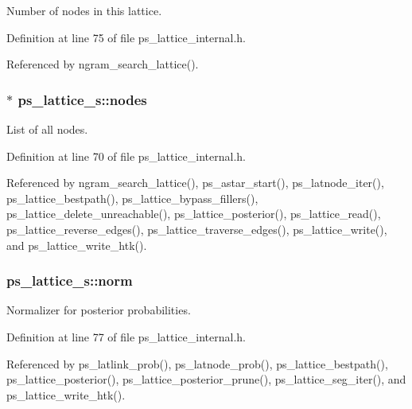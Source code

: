 \-Number of nodes in this lattice. 



\-Definition at line 75 of file ps\-\_\-lattice\-\_\-internal.\-h.



\-Referenced by ngram\-\_\-search\-\_\-lattice().

\subsubsection[{nodes}]{$\ast$ {\bf ps\-\_\-lattice\-\_\-s\-::nodes}}\label{structps__lattice__s_a838bd9223e35d012419e6225b54e393d}


\-List of all nodes. 



\-Definition at line 70 of file ps\-\_\-lattice\-\_\-internal.\-h.



\-Referenced by ngram\-\_\-search\-\_\-lattice(), ps\-\_\-astar\-\_\-start(), ps\-\_\-latnode\-\_\-iter(), ps\-\_\-lattice\-\_\-bestpath(), ps\-\_\-lattice\-\_\-bypass\-\_\-fillers(), ps\-\_\-lattice\-\_\-delete\-\_\-unreachable(), ps\-\_\-lattice\-\_\-posterior(), ps\-\_\-lattice\-\_\-read(), ps\-\_\-lattice\-\_\-reverse\-\_\-edges(), ps\-\_\-lattice\-\_\-traverse\-\_\-edges(), ps\-\_\-lattice\-\_\-write(), and ps\-\_\-lattice\-\_\-write\-\_\-htk().

\subsubsection[{norm}]{ {\bf ps\-\_\-lattice\-\_\-s\-::norm}}\label{structps__lattice__s_a68c3259613a16628e1dd2e8147705d8e}


\-Normalizer for posterior probabilities. 



\-Definition at line 77 of file ps\-\_\-lattice\-\_\-internal.\-h.



\-Referenced by ps\-\_\-latlink\-\_\-prob(), ps\-\_\-latnode\-\_\-prob(), ps\-\_\-lattice\-\_\-bestpath(), ps\-\_\-lattice\-\_\-posterior(), ps\-\_\-lattice\-\_\-posterior\-\_\-prune(), ps\-\_\-lattice\-\_\-seg\-\_\-iter(), and ps\-\_\-lattice\-\_\-write\-\_\-htk().


